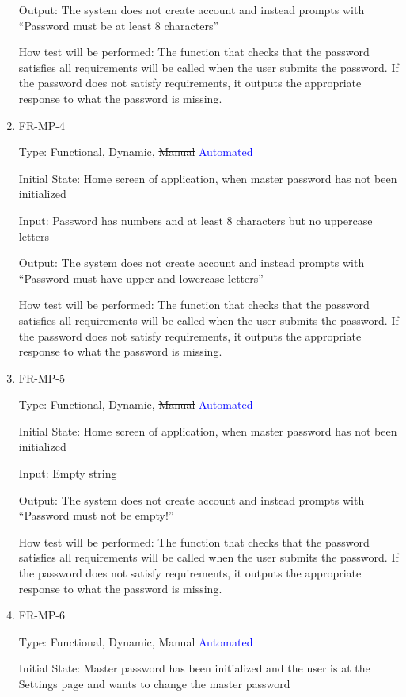 \documentclass[12pt, titlepage]{article}
\begin{document}
\begin{enumerate}
Output: The system does not create account and instead prompts with “Password must be at least 8 characters”

How test will be performed: The function that checks that the password satisfies all requirements will be called when the user submits the password. If the password does not satisfy requirements, it outputs the appropriate response to what the password is missing.

\item{FR-MP-4\\}

Type: Functional, Dynamic, \sout{Manual} \textcolor{blue}{Automated}

Initial State: Home screen of application, when master password has not been initialized 

Input: Password has numbers and at least 8 characters but no uppercase letters

Output: The system does not create account and instead prompts with “Password must have upper and lowercase letters”

How test will be performed: The function that checks that the password satisfies all requirements will be called when the user submits the password. If the password does not satisfy requirements, it outputs the appropriate response to what the password is missing.

\item{FR-MP-5\\}

Type: Functional, Dynamic, \sout{Manual} \textcolor{blue}{Automated}

Initial State: Home screen of application, when master password has not been initialized 

Input: Empty string

Output: The system does not create account and instead prompts with “Password must not be empty!”

How test will be performed: The function that checks that the password satisfies all requirements will be called when the user submits the password. If the password does not satisfy requirements, it outputs the appropriate response to what the password is missing.

\item{FR-MP-6\\}

Type: Functional, Dynamic, \sout{Manual} \textcolor{blue}{Automated}

Initial State: Master password has been initialized and \sout{the user is at the Settings page and} wants to change the master password


\end{enumerate}
\end{document}
